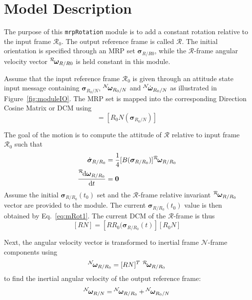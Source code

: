 

\section{Model Description}
The purpose of this {\tt mrpRotation} module is to add a constant rotation relative to the input frame $\mathcal{R}_{0}$.  The output reference frame is called $\mathcal{R}$.  The initial orientation is specified through an MRP\cite{schaub} set $\bm\sigma_{R/R0}$, while the  $\mathcal{R}$-frame angular velocity vector $\leftexp{R}{\bm\omega}_{R/R0}$ is held constant in this module.  

Assume that the input reference frame $\mathcal{R}_{0}$ is given through an attitude state input message containing $\bm\sigma_{R_{0}/N}$, $\leftexp{N}{\bm\omega}_{R_{0}/N}$ and $\leftexp{N}{\dot{\bm\omega}}_{R_{0}/N}$ as illustrated in Figure~\ref{fig:moduleIO}.  The MRP set is mapped into the corresponding Direction Cosine Matrix or DCM\cite{schaub} using
\begin{equation}
	[R_{0}N] = [R_{0}N ( \bm\sigma_{R_{0}/N})]
\end{equation}


The goal of the motion is to compute the attitude of $\mathcal{R}$ relative to input frame $\mathcal{R}_{0}$ such that
\begin{align}
	\label{eq:mRot1}
	\dot{\bm\sigma}_{R/R_{0}} &= \frac{1}{4} [B(\bm\sigma_{R/R_{0}})] \leftexp{R}{\bm\omega}_{R/R_{0}}
	\\
	\label{eq:mRot2}
	\frac{\leftexp{R}{\D} {\bm\omega}_{R/R_{0}}}{\D t} &= \bm 0
\end{align}
Assume the initial $\bm\sigma_{R/R_{0}}(t_{0})$ set and the $\mathcal{R}$-frame relative invariant $\leftexp{R}{\bm\omega}_{R/R_{0}}$ vector are provided to the module.  The current $\bm\sigma_{R/R_{0}}(t_{0})$ value is then obtained by Eq.~\eqref{eq:mRot1}.  The current DCM of the $\mathcal{R}$-frame is thus
\begin{equation}
	\label{eq:mRot3}
	[RN] = [RR_{0}(\bm\sigma_{R/R_{0}}(t) ] [R_{0}N]
\end{equation}

Next, the angular velocity vector is transformed to inertial frame $\mathcal{N}$-frame components using
\begin{equation}
	\label{eq:mRot4}
	\leftexp{N}{\bm\omega}_{R/R_{0}} = [RN]^{T}\ \leftexp{R}{\bm\omega}_{R/R_{0}}
\end{equation}
to find the inertial angular velocity of the output reference frame:
\begin{equation}
	\label{eq:mRot5}
	\leftexp{N}{\bm\omega}_{R/N} = \leftexp{N}{\bm\omega}_{R/R_{0}} + \leftexp{N}{\bm\omega}_{R_{0}/N}
\end{equation}

